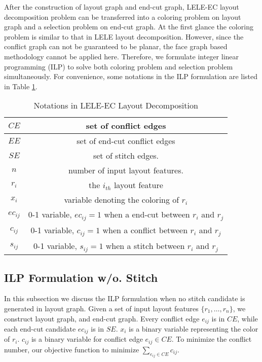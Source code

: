 \documentclass[12pt]{spieman}
\theoremstyle{plain}
\begin{document}
\begin{spacing}{1}
After the construction of layout graph and end-cut graph, LELE-EC layout decomposition problem can be transferred into a coloring problem on layout graph and a selection problem on end-cut graph.
At the first glance the coloring problem is similar to that in LELE layout decomposition.
However, since the conflict graph can not be guaranteed to be planar, the face graph based methodology \cite{DPL_ISPD2010_Xu} cannot be applied here.
Therefore, we formulate integer linear programming (ILP) to solve both coloring problem and selection problem simultaneously.
For convenience, some notations in the ILP formulation are listed in Table \ref{tab:tplec_notation}.

\begin{table}[hbt]
\centering
\caption{Notations in LELE-EC Layout Decomposition}
\label{tab:tplec_notation}
\begin{tabular}{|c|c|}
	\hline
  \hline  $CE$		    & set of conflict edges\\
	\hline  $EE$		    & set of end-cut conflict edges\\
  \hline  $SE$		    & set of stitch edges.\\
	\hline  $n$         & number of input layout features. \\
  \hline  $r_i$		    & the $i_{th}$ layout feature\\
	\hline  $x_i$		    & variable denoting the coloring of $r_i$\\
	\hline  $ec_{ij}$   & 0-1 variable, $ec_{ij}=1$ when a end-cut between $r_i$ and $r_j$\\
  \hline  $c_{ij}$	  & 0-1 variable, $c_{ij}=1$ when a conflict between $r_i$ and $r_j$\\
	\hline  $s_{ij}$	  & 0-1 variable, $s_{ij}=1$ when a stitch between $r_i$ and $r_j$\\
	\hline\hline
\end{tabular}
\end{table}


\subsection{ILP Formulation w/o. Stitch}
In this subsection we discuss the ILP formulation when no stitch candidate is generated in layout graph.
Given a set of input layout features $\{r_1, \dots, r_n\}$, we construct layout graph, and end-cut graph.
Every conflict edge $e_{ij}$ is in $CE$, while each end-cut candidate $ec_{ij}$ is in $SE$.
$x_i$ is a binary variable representing the color of $r_i$.
$c_{ij}$ is a binary variable for conflict edge $e_{ij} \in CE$.
To minimize the conflict number, our objective function to minimize $\sum_{e_{ij} \in CE} c_{ij}$.


\end{spacing}
\end{document}
